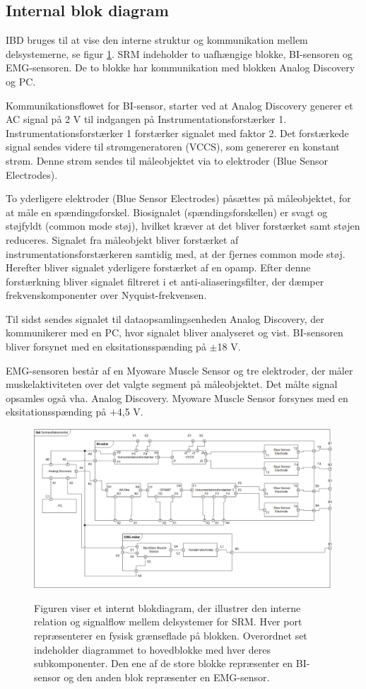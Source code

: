 \subsection{Internal blok diagram}

IBD bruges til at vise den interne struktur og kommunikation mellem delsystemerne, se figur \ref{fig:ibdfigur}. SRM indeholder to uafhængige blokke, BI-sensoren og EMG-sensoren. De to blokke har kommunikation med blokken Analog Discovery og PC. 

Kommunikationsflowet for BI-sensor, starter ved at Analog Discovery generer et AC signal på 2 V til indgangen på Instrumentationsforstærker 1. Instrumentationsforstærker 1 forstærker signalet med faktor 2. Det forstærkede signal sendes videre til strømgeneratoren (VCCS), som genererer en konstant strøm. Denne strøm sendes til måleobjektet via to elektroder (Blue Sensor Electrodes). 

To yderligere elektroder (Blue Sensor Electrodes) påsættes på måleobjektet, for at måle en spændingsforskel. Biosignalet (spændingsforskellen) er svagt og støjfyldt (common mode støj), hvilket kræver at det bliver forstærket samt støjen reduceres. Signalet fra måleobjekt bliver forstærket af instrumentationsforstærkeren samtidig med, at der fjernes common mode støj. Herefter bliver signalet yderligere forstærket af en opamp. Efter denne forstærkning bliver signalet filtreret i et anti-aliaseringsfilter, der dæmper frekvenskomponenter over Nyquist-frekvensen. 

Til sidst sendes signalet til dataopsamlingsenheden Analog Discovery, der kommunikerer med en PC, hvor signalet bliver analyseret og vist. BI-sensoren bliver forsynet med en eksitationsspænding på $\pm$18 V.

EMG-sensoren består af en Myoware Muscle Sensor og tre elektroder, der måler muskelaktiviteten over det valgte segment på måleobjektet. Det målte signal opsamles også vha. Analog Discovery. Myoware Muscle Sensor forsynes med en eksitationsspænding på $+$4,5 V.


\begin{figure}[H]
\centering
{\includegraphics[width=\linewidth]
{Figure/IBD}}
\caption{Figuren viser et internt blokdiagram, der illustrer den interne relation og signalflow mellem delsystemer for SRM. Hver port repræsenterer en fysisk grænseflade på blokken. Overordnet set indeholder diagrammet to hovedblokke med hver deres subkomponenter. Den ene af de store blokke repræsenter en BI-sensor og den anden blok repræsenter en EMG-sensor.}
\label{fig:ibdfigur}
\end{figure}


